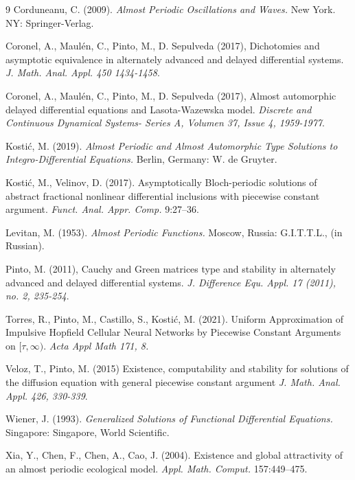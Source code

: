 \documentclass[english,reqno]{amsart}
\numberwithin{equation}{section}
\theoremstyle{plain}
\theoremstyle{definition}
\theoremstyle{remark}
\begin{document}
\begin{thebibliography}{9}
Corduneanu, C. (2009).
{\it Almost Periodic Oscillations and Waves.}
New York. NY: Springer-Verlag.

 Coronel, A.,  Maul\'en, C., Pinto, M.,  D. Sepulveda (2017),
Dichotomies and asymptotic equivalence in alternately advanced and delayed differential systems.
{\it J. Math. Anal. Appl. 450 1434-1458}.

 Coronel, A.,  Maul\'en, C., Pinto, M.,  D. Sepulveda (2017),
Almost automorphic delayed differential equations and Lasota-Wazewska model.
{\it Discrete and Continuous Dynamical Systems- Series A, Volumen 37, Issue 4, 1959-1977}.



Kosti\'c, M. (2019).
{\it Almost Periodic and Almost Automorphic Type Solutions to Integro-Differential Equations.} Berlin, Germany:
W. de Gruyter.

Kosti\'c, M., Velinov, D. (2017).
Asymptotically Bloch-periodic solutions of abstract fractional nonlinear differential inclusions with piecewise constant argument.
{\it Funct. Anal. Appr. Comp.} 9:27--36.

Levitan, M. (1953).
\textit{Almost Periodic Functions.} Moscow, Russia:
G.I.T.T.L., (in Russian).

Pinto, M. (2011), 
Cauchy and Green matrices type and stability in alternately advanced and delayed differential systems.
{\it  J. Difference Equ. Appl. 17 (2011), no. 2, 235-254}.

Torres, R.,  Pinto, M., Castillo, S.,  Kosti\'c, M. (2021).
Uniform Approximation of Impulsive Hopfield Cellular Neural Networks by Piecewise Constant Arguments on $[\tau , \infty )$.
{\it Acta Appl Math 171, 8.}

Veloz, T., Pinto, M. (2015)
Existence, computability and stability for solutions of the diffusion equation with general piecewise constant argument
{\it J. Math. Anal. Appl. 426, 330-339}.



Wiener, J. (1993).
{\it Generalized Solutions of Functional Differential Equations.}
Singapore: Singapore,
World Scientific.

Xia, Y., Chen, F., Chen, A., Cao, J. (2004).
Existence and global attractivity of an almost periodic ecological model.
{\it Appl. Math. Comput.} 157:449--475.


\end{thebibliography}
\end{document}
